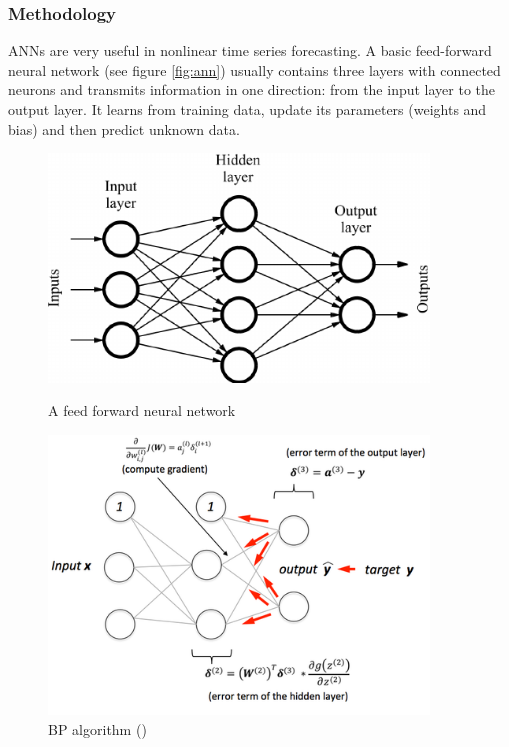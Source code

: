 \documentclass[a4paper,reqno,]{article}
\begin{document}
\subsubsection{Methodology}
ANNs are very useful in nonlinear time series forecasting. A basic feed-forward neural network (see figure \ref{fig:ann}) usually contains three layers with connected neurons and transmits information in one direction: from the input layer to the output layer. It learns from training data, update its parameters (weights and bias) and then predict unknown data.
\begin{figure}[H]
\begin{minipage}[b]{0.5\textwidth}
\centering
    \includegraphics[width=0.9\textwidth]{images/ANN/ann.png}
    \caption{A feed forward neural network}
       \label{fig:ann}
\end{minipage}
\begin{minipage}[b]{0.5\textwidth}
\centering
    \includegraphics[width=0.9\textwidth]{images/ANN/backpropagation.png}
    \caption{BP algorithm (\cite{raschka})}
       \label{fig:bp}
\end{minipage}
\end{figure} 
\end{document}
